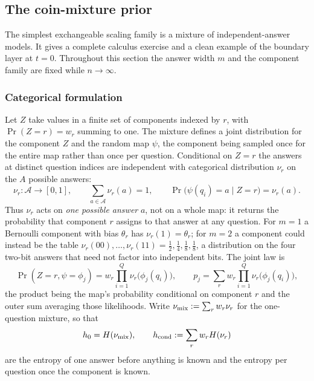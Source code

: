 \subsection{The coin-mixture prior}\label{sec:coins}

The simplest exchangeable scaling family is a mixture of
independent-answer models. It gives a complete calculus exercise and
a clean example of the boundary layer at $t = 0$. Throughout this
section the answer width $m$ and the component family are fixed while
$n \to \infty$.

\subsubsection{Categorical formulation}

Let $Z$ take values in a finite set of components indexed by $r$, with
$\Pr(Z = r) = w_r$ summing to one. The mixture defines a joint
distribution for the component $Z$ and the random map $\psi$, the
component being sampled once for the entire map rather than once per
question. Conditional on $Z = r$ the answers at distinct question
indices are independent with categorical distribution $\nu_r$ on the
$A$ possible answers:
%
\begin{equation}
  \nu_r : \mathcal A \to [0,1],
  \qquad
  \sum_{a\in\mathcal A}\nu_r(a) = 1,
  \qquad
  \Pr\big(\psi(q_i) = a \mid Z = r\big) = \nu_r(a).
  \label{eq:coincomponent}
\end{equation}
%
Thus $\nu_r$ acts on \emph{one possible answer} $a$, not on a whole
map: it returns the probability that component $r$ assigns to that
answer at any question. For $m=1$ a Bernoulli component with bias
$\theta_r$ has $\nu_r(1) = \theta_r$; for $m = 2$ a component could
instead be the table $\nu_r(00),\ldots,\nu_r(11)
= \tfrac12,\tfrac14,\tfrac18,\tfrac18$, a distribution on the four
two-bit answers that need not factor into independent bits. The joint
law is
%
\begin{equation}
  \Pr(Z = r, \psi = \phi_j)
  = w_r\prod_{i=1}^{Q}\nu_r\big(\phi_j(q_i)\big),
  \qquad
  p_j = \sum_r w_r\prod_{i=1}^{Q}\nu_r\big(\phi_j(q_i)\big),
  \label{eq:coinprior}
\end{equation}
%
the product being the map's probability conditional on component $r$
and the outer sum averaging those likelihoods. Write
$\nu_{\rm mix} := \sum_r w_r\nu_r$ for the one-question mixture, so
that
%
\begin{equation}
  h_0 = H(\nu_{\rm mix}),
  \qquad
  h_{\rm cond} := \sum_r w_r H(\nu_r)
  \label{eq:coinentropies}
\end{equation}
%
are the entropy of one answer before anything is known and the
entropy per question once the component is known.

